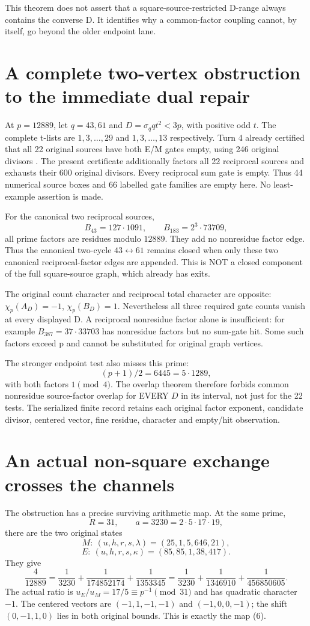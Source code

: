 This theorem does not assert that a square-source-restricted D-range always
contains the converse D. It identifies why a common-factor coupling cannot,
by itself, go beyond the older endpoint lane.

\section{A complete two-vertex obstruction to the immediate dual repair}
At $p=12889$, let $q=43,61$ and $D=\sigma_q qt^2<3p$, with positive odd $t$.
The complete t-lists are $1,3,\ldots,29$ and $1,3,\ldots,13$ respectively.
Turn 4 already certified that all 22 original sources have both E/M gates empty,
using 246 original divisors \cite[\S8]{Turn4}.
The present certificate additionally factors all 22 reciprocal sources and
exhausts their 600 original divisors. Every reciprocal sum gate is empty.
Thus 44 numerical source boxes and 66 labelled gate families are empty here.
No least-example assertion is made.

For the canonical two reciprocal sources,
\[
 B_{43}=127\cdot1091,\qquad B_{183}=2^3\cdot73709,
\]
all prime factors are residues modulo $12889$. They add no nonresidue factor
edge. Thus the canonical two-cycle $43\leftrightarrow61$ remains closed when
only these two canonical reciprocal-factor edges are appended. This is NOT a
closed component of the full square-source graph, which already has exits.

The original count character and reciprocal total character are opposite:
$\chi_p(A_D)=-1$, $\chi_p(B_D)=1$. Nevertheless all three required gate counts
vanish at every displayed D. A reciprocal nonresidue factor alone is insufficient:
for example $B_{387}=37\cdot33703$ has nonresidue factors but no sum-gate hit.
Some such factors exceed p and cannot be substituted for original graph vertices.

The stronger endpoint test also misses this prime:
\[
 (p+1)/2=6445=5\cdot1289,
\]
with both factors $1\pmod4$. The overlap theorem therefore forbids common nonresidue
source-factor overlap for EVERY $D$ in its interval, not just for the 22 tests.
The serialized finite record retains each original factor exponent, candidate
divisor, centered vector, fine residue, character and empty/hit observation.

\section{An actual non-square exchange crosses the channels}
The obstruction has a precise surviving arithmetic map. At the same prime,
\[
 R=31,\qquad a=3230=2\cdot5\cdot17\cdot19,
\]
there are the two original states
\[
 M:\ (u,h,r,s,\lambda)=(25,1,5,646,21),
\]
\[
 E:\ (u,h,r,s,\kappa)=(85,85,1,38,417).
\]
They give
\[
 \frac4{12889}=\frac1{3230}+\frac1{174852174}+\frac1{1353345}
 =\frac1{3230}+\frac1{1346910}+\frac1{456850605}.          \tag{20}
\]
The actual ratio is $u_E/u_M=17/5\equiv p^{-1}\pmod{31}$ and has quadratic
character $-1$. The centered vectors are $(-1,1,-1,-1)$ and $(-1,0,0,-1)$;
the shift $(0,-1,1,0)$ lies in both original bounds. This is exactly the map (6).

